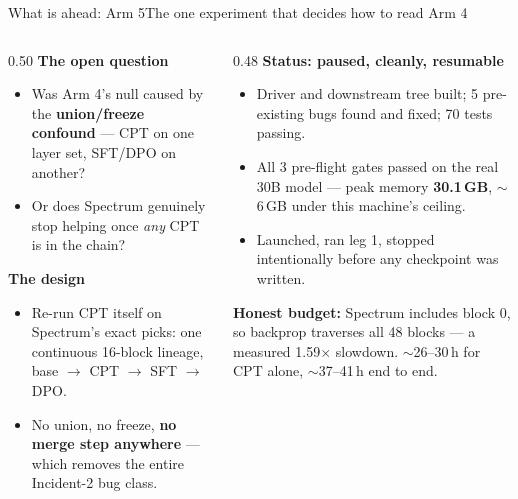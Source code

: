 \documentclass[aspectratio=169,11pt]{beamer}
\newcommand{\warn}[1]{\textcolor{jsWarm}{\textbf{#1}}}
\newcommand{\mut}[1]{\textcolor{jsMute}{#1}}
\begin{document}
\begin{frame}{What is ahead: Arm 5}{The one experiment that decides how to read Arm 4}
  \small
  \begin{columns}[T]
    \begin{column}{0.50\textwidth}
      \textbf{The open question}
      \begin{itemize}
        \item Was Arm 4's null caused by the \textbf{union/freeze confound} --- CPT on one layer set, SFT/DPO on another?
        \item Or does Spectrum genuinely stop helping once \emph{any} CPT is in the chain?
      \end{itemize}
      \vspace{0.4em}
      \textbf{The design}
      \begin{itemize}
        \item Re-run CPT itself on Spectrum's exact picks: one continuous 16-block lineage, base $\rightarrow$ CPT $\rightarrow$ SFT $\rightarrow$ DPO.
        \item No union, no freeze, \textbf{no merge step anywhere} --- which removes the entire Incident-2 bug class.
      \end{itemize}
    \end{column}
    \begin{column}{0.48\textwidth}
      \textbf{Status: \warn{paused, cleanly, resumable}}
      \begin{itemize}
        \item Driver and downstream tree built; 5 pre-existing bugs found and fixed; 70 tests passing.
        \item All 3 pre-flight gates passed on the real 30B model --- peak memory \textbf{30.1\,GB}, $\sim$6\,GB under this machine's ceiling.
        \item Launched, ran leg 1, stopped intentionally before any checkpoint was written.
      \end{itemize}
      \vspace{0.3em}
      \mut{\textbf{Honest budget:} Spectrum includes block 0, so backprop traverses all 48 blocks --- a measured 1.59$\times$ slowdown. $\sim$26--30\,h for CPT alone, $\sim$37--41\,h end to end.}
    \end{column}
  \end{columns}
\end{frame}
\end{document}
